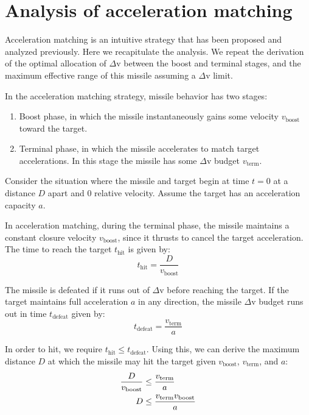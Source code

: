 \documentclass{article}
\begin{document}
\section{Analysis of acceleration matching}

Acceleration matching is an intuitive strategy that has been proposed and
analyzed previously. Here we recapitulate the analysis. We repeat the derivation
of the optimal allocation of $\Delta$v between the boost and terminal stages,
and the maximum effective range of this missile assuming a $\Delta$v limit.

In the acceleration matching strategy, missile behavior has two stages:
\begin{enumerate}
\item Boost phase, in which the missile instantaneously gains some velocity
$v_\text{boost}$ toward the target.
\item Terminal phase, in which the missile accelerates to match target
accelerations. In this stage the missile has some $\Delta$v budget
$v_\text{term}$.
\end{enumerate}

Consider the situation where the missile and target begin at time $t = 0$ at a
distance $D$ apart and 0 relative velocity. Assume the target has an
acceleration capacity $a$.

In acceleration matching, during the terminal phase, the missile maintains a
constant closure velocity $v_\text{boost}$, since it thrusts to cancel the
target acceleration. The time to reach the target $t_\text{hit}$ is given by:
\begin{equation}
t_\text{hit} = \frac{D}{v_\text{boost}}
\end{equation}

The missile is defeated if it runs out of $\Delta$v before reaching the target.
If the target maintains full acceleration $a$ in any direction, the missile
$\Delta$v budget runs out in time $t_\text{defeat}$ given by:
\begin{equation}
t_\text{defeat} = \frac{v_\text{term}}{a}
\end{equation}

In order to hit, we require $t_\text{hit} \le t_\text{defeat}$. Using this, we
can derive the maximum distance $D$ at which the missile may hit the target
given $v_\text{boost}$, $v_\text{term}$, and $a$:
\begin{align}
\frac{D}{v_\text{boost}} &\le \frac{v_\text{term}}{a} \\ \notag
D &\le \frac{v_\text{term} v_\text{boost}}{a}
\end{align}
\end{document}
